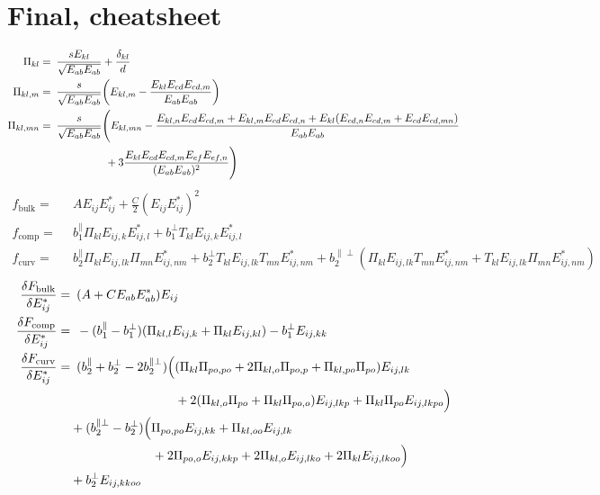 \documentclass[11pt]{article}
\begin{document}
\section{Final, cheatsheet}
\begin{align}
    \Pi_{kl} =&\enspace \frac{s E_{kl}}{\sqrt{E_{ab}E_{ab}}} + \frac{\delta_{kl}}{d} \\
    \Pi_{kl,m} =&\enspace \frac{s}{\sqrt{E_{ab}E_{ab}}} \qty(E_{kl,m} - \frac{E_{kl}E_{cd}E_{cd,m}}{E_{ab}E_{ab}}) \\
    \Pi_{kl,mn} =&\enspace \frac{s}{\sqrt{E_{ab}E_{ab}}} \Biggl(E_{kl,mn} - \frac{E_{kl,n}E_{cd}E_{cd,m} + E_{kl,m}E_{cd}E_{cd,n} + E_{kl}(E_{cd,n}E_{cd,m} + E_{cd}E_{cd,mn})}{E_{ab}E_{ab}} \\
    &\phantom{\frac{s}{\sqrt{E_{ab}E_{ab}}} \Biggl(} + 3\frac{E_{kl}E_{cd}E_{cd,m}E_{ef}E_{ef,n}}{(E_{ab}E_{ab})^2} \Biggr)
\end{align}
\begin{align}
    f_\text{bulk} =&\enspace A E_{ij}E_{ij}^* + \frac{C}{2} (E_{ij}E_{ij}^*)^2 \\
    f_\text{comp} =&\enspace b_1^\parallel \Pi_{kl} E_{ij,k}E_{ij,l}^* + b_1^\perp T_{kl} E_{ij,k}E_{ij,l}^* \\
    f_\text{curv} =&\enspace b_2^\parallel \Pi_{kl}E_{ij,lk}\Pi_{mn}E_{ij,nm}^* + b_2^\perp T_{kl}E_{ij,lk}T_{mn}E_{ij,nm}^* + b_2^{\parallel\perp}(\Pi_{kl}E_{ij,lk}T_{mn}E_{ij,nm}^* + T_{kl}E_{ij,lk}\Pi_{mn}E_{ij,nm}^*)
\end{align}
\begin{align}
    \fdv{F_\text{bulk}}{E_{ij}^*} =&\enspace \qty(A + C E_{ab}E_{ab}^*)E_{ij} \\
    \fdv{F_\text{comp}}{E_{ij}^*} =&\enspace -(b_1^\parallel - b_1^\perp) (\Pi_{kl,l} E_{ij,k} + \Pi_{kl} E_{ij,kl}) - b_1^\perp E_{ij,kk} \\
    \fdv{F_\text{curv}}{E_{ij}^*} =&\enspace (b_2^\parallel + b_2^\perp - 2b_2^{\parallel\perp}) \Bigl( (\Pi_{kl}\Pi_{po,po} + 2\Pi_{kl,o}\Pi_{po,p} + \Pi_{kl,po}\Pi_{po})E_{ij,lk} \\
    &\phantom{\enspace (b_2^\parallel + b_2^\perp - 2b_2^{\parallel\perp}) \Bigl(}+ 2(\Pi_{kl,o}\Pi_{po} + \Pi_{kl}\Pi_{po,o})E_{ij,lkp} + \Pi_{kl}\Pi_{po}E_{ij,lkpo} \Bigr) \nonumber \\
    &+ (b_2^{\parallel\perp} - b_2^\perp)\Bigl( \Pi_{po,po}E_{ij,kk} + \Pi_{kl,oo}E_{ij,lk} \nonumber \\ 
    &\phantom{\enspace+ (b_2^{\parallel\perp} - b_2^\perp)\Bigl(}+ 2\Pi_{po,o}E_{ij,kkp} + 2\Pi_{kl,o}E_{ij,lko} + 2\Pi_{kl}E_{ij,lkoo} \Bigr) \nonumber \\ 
    &+ b_2^\perp E_{ij,kkoo} \nonumber
\end{align}
\end{document}
